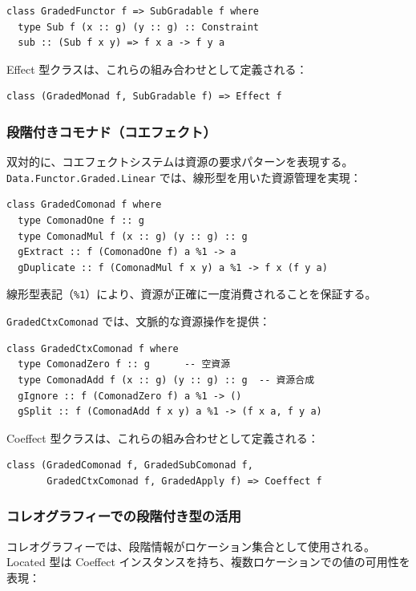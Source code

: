 \begin{verbatim}
class GradedFunctor f => SubGradable f where
  type Sub f (x :: g) (y :: g) :: Constraint
  sub :: (Sub f x y) => f x a -> f y a
\end{verbatim}

Effect 型クラスは、これらの組み合わせとして定義される：
\begin{verbatim}
class (GradedMonad f, SubGradable f) => Effect f
\end{verbatim}

\subsubsection{段階付きコモナド（コエフェクト）}

双対的に、コエフェクトシステムは資源の要求パターンを表現する。\texttt{Data.Functor.Graded.Linear} では、線形型を用いた資源管理を実現：

\begin{verbatim}
class GradedComonad f where
  type ComonadOne f :: g
  type ComonadMul f (x :: g) (y :: g) :: g
  gExtract :: f (ComonadOne f) a %1 -> a
  gDuplicate :: f (ComonadMul f x y) a %1 -> f x (f y a)
\end{verbatim}

線形型表記（\texttt{\%1}）により、資源が正確に一度消費されることを保証する。

\texttt{GradedCtxComonad} では、文脈的な資源操作を提供：
\begin{verbatim}
class GradedCtxComonad f where
  type ComonadZero f :: g      -- 空資源
  type ComonadAdd f (x :: g) (y :: g) :: g  -- 資源合成
  gIgnore :: f (ComonadZero f) a %1 -> ()
  gSplit :: f (ComonadAdd f x y) a %1 -> (f x a, f y a)
\end{verbatim}

Coeffect 型クラスは、これらの組み合わせとして定義される：
\begin{verbatim}
class (GradedComonad f, GradedSubComonad f,
       GradedCtxComonad f, GradedApply f) => Coeffect f
\end{verbatim}

\subsubsection{コレオグラフィーでの段階付き型の活用}

コレオグラフィーでは、段階情報がロケーション集合として使用される。Located 型は Coeffect インスタンスを持ち、複数ロケーションでの値の可用性を表現：

